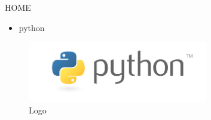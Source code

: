 
\sloppy
{\fontsize{14pt}{14pt}\selectfont HOME \\} \par
\begin{itemize}
	\item python
\end{itemize}
\begin{figure}[ht]
	\centerline{\includegraphics[width=0.70\textwidth]{figures/python}}
	\caption{Logo}
	\label{Logo}
\end{figure}

